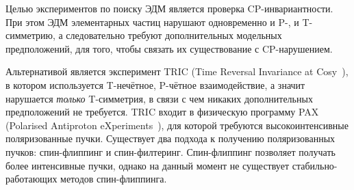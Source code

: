 
Целью экспериментов по поиску ЭДМ является проверка CP-инвариантности. При этом ЭДМ элементарных частиц нарушают одновременно и P-, и T-симметрию, а следовательно требуют дополнительных модельных предположений, для того, чтобы связать их существование с CP-нарушением.~\cite[стр.~1926]{Aksentev:TRIC}

Альтернативой является эксперимент TRIC (Time Reversal Invariance at Cosy~\cite{Aksentev:TRIC}), 
в котором используется T-нечётное, P-чётное взаимодействие, а значит нарушается \emph{только} T-симметрия, 
в связи с чем никаких дополнительных предположений не требуется.
%
TRIC входит в физическую программу PAX (Polarised Antiproton eXperiments~\cite{Aksentev:PAX}), для которой требуются высокоинтенсивные поляризованные пучки. Существует два подхода к получению поляризованных пучков: спин-флиппинг и спин-филтеринг. Спин-флиппинг позволяет получать более интенсивные пучки, однако на данный момент не существует стабильно-работающих методов спин-флиппинга.
